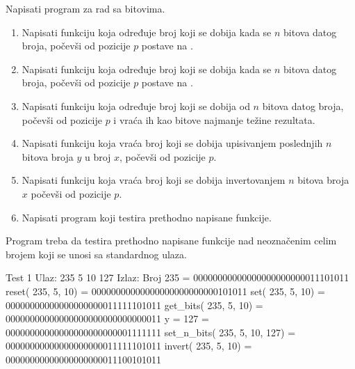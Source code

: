 \begin{Exercise}[label=204]
Napisati program za rad sa bitovima.
\begin{enumerate}
\item Napisati funkciju koja određuje broj koji se dobija kada se $n$ bitova datog broja, počevši od pozicije $p$ postave na .
\item Napisati funkciju koja određuje broj koji se dobija kada se $n$ bitova datog broja, počevši od pozicije $p$ postave na .
\item Napisati funkciju koja određuje broj koji se dobija od $n$ bitova datog broja, počevši od pozicije $p$ i vraća ih kao bitove najmanje težine rezultata.
\item Napisati funkciju koja vraća broj koji se dobija upisivanjem poslednjih $n$ bitova broja $y$ u broj $x$, počevši od pozicije $p$.
\item Napisati funkciju koja vraća broj koji se dobija invertovanjem $n$ bitova broja $x$ počevši od pozicije $p$.
\item Napisati program koji testira prethodno napisane funkcije.
\end{enumerate}
Program treba da testira prethodno napisane funkcije nad neoznačenim celim brojem koji se unosi sa standardnog ulaza.


\begin{maxitest}
\begin{test}{Test 1}
Ulaz:   235 5 10 127  
Izlaz:  
  Broj   235                          = 00000000000000000000000011101011
  reset(  235,    5,   10)            = 00000000000000000000000000101011
  set(  235,    5,   10)              = 00000000000000000000011111101011
  get_bits(  235,    5,   10)         = 00000000000000000000000000000011
  y =                             127 = 00000000000000000000000001111111
  set_n_bits(  235,    5,   10,  127) = 00000000000000000000011111101011
  invert(  235,    5,   10)           = 00000000000000000000011100101011
\end{test}
\end{maxitest}

\end{Exercise}
\begin{Answer}[ref=204]
\end{Answer}



